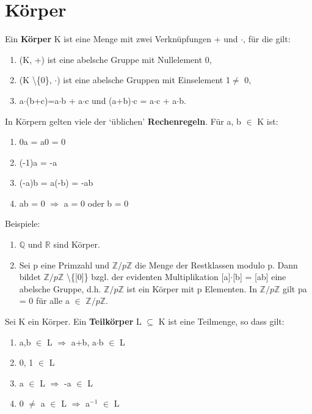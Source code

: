 \section{Körper}
\begin{definition}
Ein \textbf{Körper} K ist eine Menge mit zwei Verknüpfungen + und $\cdot$, für die gilt:
\begin{enumerate}
\item (K, +) ist eine abelsche Gruppe mit Nullelement 0,
\item (K \textbackslash \{0\}, $\cdot$) ist eine abelsche Gruppen mit Einselement 1$\neq$ 0,
\item a$\cdot$(b+c)=a$\cdot$b + a$\cdot$c und (a+b)$\cdot$c = a$\cdot$c + a$\cdot$b.
\end{enumerate}
\end{definition}

In Körpern gelten viele der ‘üblichen’ \textbf{Rechenregeln}. Für a, b $\in$ K ist:
\begin{enumerate} 
\item 0a = a0 = 0 
\item (-1)a = -a
\item (-a)b = a(-b) = -ab
\item ab = 0 $\Rightarrow$ a = 0 oder b = 0
\end{enumerate}

Beispiele:
\begin{enumerate}
\item $\mathbb{Q}$ und $\mathbb{R}$ sind Körper.
\item Sei p eine Primzahl und $\mathbb{Z}/p\mathbb{Z}$ die Menge der Restklassen modulo p. Dann bildet $\mathbb{Z}/p\mathbb{Z}$ \textbackslash\{[0]\} bzgl. der evidenten Multiplikation [a]$\cdot$[b] = [ab] eine abelsche Gruppe, d.h. $\mathbb{Z}/p\mathbb{Z}$ ist ein Körper mit p Elementen. In $\mathbb{Z}/p\mathbb{Z}$ gilt pa = 0 für alle a $\in$ $\mathbb{Z}/p\mathbb{Z}$.
\end{enumerate}

\begin{definition}
Sei K ein Körper. Ein \textbf{Teilkörper} L $\subseteq$ K ist eine Teilmenge, so dass gilt:
\begin{enumerate}
\item a,b $\in$ L $\Rightarrow$ a+b, a$\cdot$b $\in$ L
\item 0, 1 $\in$ L
\item a $\in$ L $\Rightarrow$ -a $\in$ L
\item 0 $\neq$ a $\in$ L $\Rightarrow$ a$^{-1}$ $\in$ L
\end{enumerate}
\end{definition}


